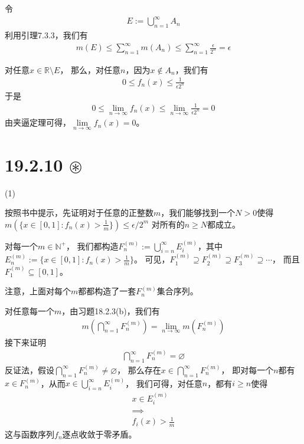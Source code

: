 \documentclass{article}
\begin{document}
令
\begin{align*}
  E := \bigcup\limits_{n = 1}^\infty A_n
\end{align*}
利用引理7.3.3，我们有
\begin{align*}
  m(E) \leq \sum\limits_{n = 1}^\infty m(A_n) \leq \sum\limits_{n = 1}^\infty \frac{\epsilon}{2^n} = \epsilon
\end{align*}

对任意$x \in \mathbb{R} \setminus E$，
那么，对任意$n$，因为$x \notin A_n$，我们有
\begin{align*}
  0 \leq f_n(x) \leq \frac{1}{\epsilon 2^n}
\end{align*}
于是
\begin{align*}
  0 \leq \lim\limits_{n \to \infty} f_n(x) \leq \lim\limits_{n \to \infty} \frac{1}{\epsilon 2^n} = 0
\end{align*}
由夹逼定理可得，$\lim\limits_{n \to \infty} f_n(x) = 0$。

\section*{19.2.10 $\circledast$}

 (1)

按照书中提示，先证明对于任意的正整数$m$，我们能够找到一个$N > 0$使得
$m(\{x \in [0, 1]: f_n(x) > \frac{1}{m}\}) \leq \epsilon/2^m$
对所有的$n \geq N$都成立。

对每一个$m \in \mathbb{N}^+$，
我们都构造$F_n^{(m)} := \bigcup\limits_{i = n}^\infty E_i^{(m)}$，其中
$E_n^{(m)} := \{x \in [0, 1]: f_n(x) > \frac{1}{m}\}$。
可见，$F_1^{(m)} \supseteq F_2^{(m)} \supseteq F_3^{(m)} \supseteq \cdots$，
而且$F_1^{(m)} \subseteq [0, 1]$。

注意，上面对每个$m$都都构造了一套$F_n^{(m)}$集合序列。

对任意每一个$m$，由习题18.2.3(b)，我们有
\begin{align*}
  m(\bigcap\limits_{n = 1}^\infty F_n^{(m)}) = \lim\limits_{n \to \infty} m(F_n^{(m)})
\end{align*}
接下来证明
\begin{align*}
  \bigcap\limits_{n = 1}^\infty F_n^{(m)} = \varnothing
\end{align*}
反证法，假设$\bigcap\limits_{n = 1}^\infty F_n^{(m)} \neq \varnothing$，
那么存在$x \in \bigcap\limits_{n = 1}^\infty F_n^{(m)}$，
即对每一个$n$都有$x \in F_n^{(m)}$，从而$x \in \bigcup\limits_{i = n}^\infty E_i^{(m)}$，
我们可得，对任意$n$，都有$i \geq n$使得
\begin{align*}
  x \in E_i^{(m)} \\
  \implies        \\
  f_i(x) > \frac{1}{m}
\end{align*}
这与函数序列$f_n$逐点收敛于零矛盾。
\end{document}
